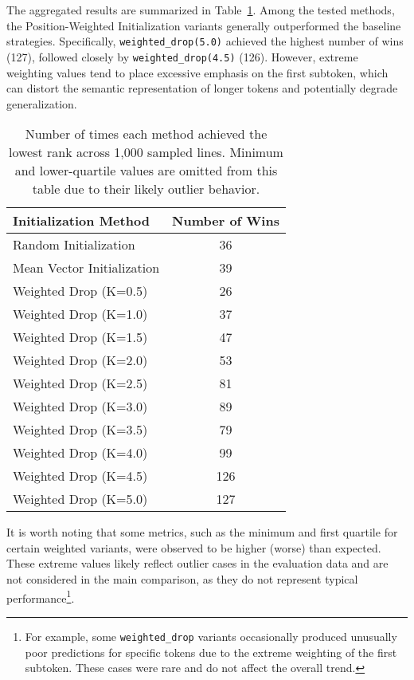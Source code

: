 The aggregated results are summarized in Table~\ref{tab:embed_init_results}. Among the tested methods, the Position-Weighted Initialization variants generally outperformed the baseline strategies. Specifically, \texttt{weighted\_drop(5.0)} achieved the highest number of wins (127), followed closely by \texttt{weighted\_drop(4.5)} (126). However, extreme weighting values tend to place excessive emphasis on the first subtoken, which can distort the semantic representation of longer tokens and potentially degrade generalization.

\begin{table}[ht]
    \centering
    \begin{tabular}{l c}
        \toprule
        Initialization Method & Number of Wins \\
        \midrule
        Random Initialization & 36 \\
        Mean Vector Initialization & 39 \\
        Weighted Drop (K=0.5) & 26 \\
        Weighted Drop (K=1.0) & 37 \\
        Weighted Drop (K=1.5) & 47 \\
        Weighted Drop (K=2.0) & 53 \\
        Weighted Drop (K=2.5) & 81 \\
        Weighted Drop (K=3.0) & 89 \\
        Weighted Drop (K=3.5) & 79 \\
        Weighted Drop (K=4.0) & 99 \\
        Weighted Drop (K=4.5) & 126 \\
        Weighted Drop (K=5.0) & 127 \\
        \bottomrule
    \end{tabular}
    \caption{Number of times each method achieved the lowest rank across 1,000 sampled lines. Minimum and lower-quartile values are omitted from this table due to their likely outlier behavior.}
    \label{tab:embed_init_results}
\end{table}

It is worth noting that some metrics, such as the minimum and first quartile for certain weighted variants, were observed to be higher (worse) than expected. These extreme values likely reflect outlier cases in the evaluation data and are not considered in the main comparison, as they do not represent typical performance\footnote{For example, some \texttt{weighted\_drop} variants occasionally produced unusually poor predictions for specific tokens due to the extreme weighting of the first subtoken. These cases were rare and do not affect the overall trend.}.

